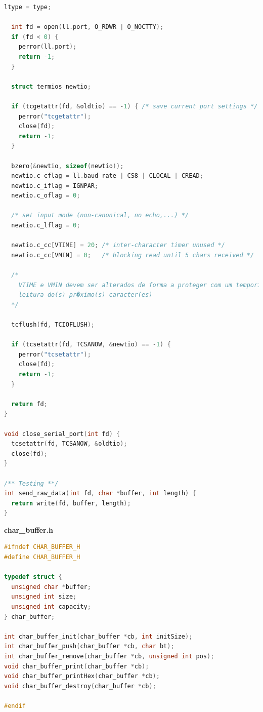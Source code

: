 \documentclass[11pt]{article}
\begin{document}
\begin{lstlisting}[language=C]
  ltype = type;

  int fd = open(ll.port, O_RDWR | O_NOCTTY);
  if (fd < 0) {
    perror(ll.port);
    return -1;
  }

  struct termios newtio;

  if (tcgetattr(fd, &oldtio) == -1) { /* save current port settings */
    perror("tcgetattr");
    close(fd);
    return -1;
  }

  bzero(&newtio, sizeof(newtio));
  newtio.c_cflag = ll.baud_rate | CS8 | CLOCAL | CREAD;
  newtio.c_iflag = IGNPAR;
  newtio.c_oflag = 0;

  /* set input mode (non-canonical, no echo,...) */
  newtio.c_lflag = 0;

  newtio.c_cc[VTIME] = 20; /* inter-character timer unused */
  newtio.c_cc[VMIN] = 0;   /* blocking read until 5 chars received */

  /*
    VTIME e VMIN devem ser alterados de forma a proteger com um temporizador a
    leitura do(s) pr�ximo(s) caracter(es)
  */

  tcflush(fd, TCIOFLUSH);

  if (tcsetattr(fd, TCSANOW, &newtio) == -1) {
    perror("tcsetattr");
    close(fd);
    return -1;
  }

  return fd;
}

void close_serial_port(int fd) {
  tcsetattr(fd, TCSANOW, &oldtio);
  close(fd);
}

/** Testing **/
int send_raw_data(int fd, char *buffer, int length) {
  return write(fd, buffer, length);
}


\end{lstlisting}

\newpage
\thispagestyle{fancy}
\fancyhf{}
\fancyfoot[R]{\thepage}
\renewcommand*{\footrulewidth}{1pt}
\textbf{char\_buffer.h}
\begin{lstlisting}[language=C]
#ifndef CHAR_BUFFER_H
#define CHAR_BUFFER_H

typedef struct {
  unsigned char *buffer;
  unsigned int size;
  unsigned int capacity;
} char_buffer;

int char_buffer_init(char_buffer *cb, int initSize);
int char_buffer_push(char_buffer *cb, char bt);
int char_buffer_remove(char_buffer *cb, unsigned int pos);
void char_buffer_print(char_buffer *cb);
void char_buffer_printHex(char_buffer *cb);
void char_buffer_destroy(char_buffer *cb);

#endif


\end{lstlisting}
\end{document}
